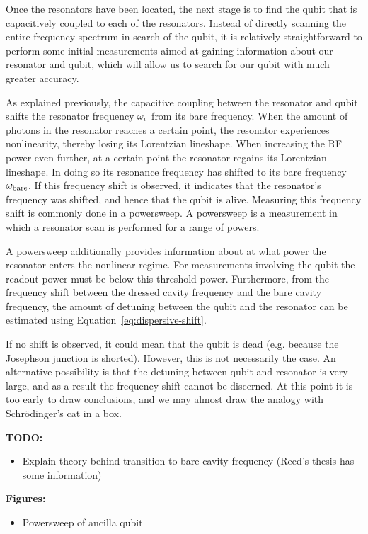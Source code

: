         Once the resonators have been located, the next stage is to find the qubit that is capacitively coupled to each of the resonators. Instead of directly scanning the entire frequency spectrum in search of the qubit, it is relatively straightforward to perform some initial measurements aimed at gaining information about our resonator and qubit, which will allow us to search for our qubit with much greater accuracy.

        As explained previously, the capacitive coupling between the resonator and qubit shifts the resonator frequency $\omega_\text{r}$ from its bare frequency. When the amount of photons in the resonator reaches a certain point, the resonator experiences nonlinearity, thereby losing its Lorentzian lineshape. When increasing the RF power even further, at a certain point the resonator regains its Lorentzian lineshape. In doing so its resonance frequency has shifted to its bare frequency $\omega_\text{bare}$. If this frequency shift is observed, it indicates that the resonator's frequency was shifted, and hence that the qubit is alive. Measuring this frequency shift is commonly done in a powersweep. A powersweep is a measurement in which a resonator scan is performed for a range of powers.

        A powersweep additionally provides information about at what power the resonator enters the nonlinear regime. For measurements involving the qubit the readout power must be below this threshold power. Furthermore, from the frequency shift between the dressed cavity frequency and the bare cavity frequency, the amount of detuning between the qubit and the resonator can be estimated using Equation~\ref{eq:dispersive-shift}.

        If no shift is observed, it could mean that the qubit is dead (e.g. because the Josephson junction is shorted). However, this is not necessarily the case. An alternative possibility is that the detuning between qubit and resonator is very large, and as a result the frequency shift cannot be discerned. At this point it is too early to draw conclusions, and we may almost draw the analogy with Schr\"odinger's cat in a box.

        \textbf{TODO:}
        \begin{itemize}
          \item Explain theory behind transition to bare cavity frequency (Reed's thesis has some information)
        \end{itemize}

        \textbf{Figures:}
        \begin{itemize}
          \item Powersweep of ancilla qubit
        \end{itemize}

